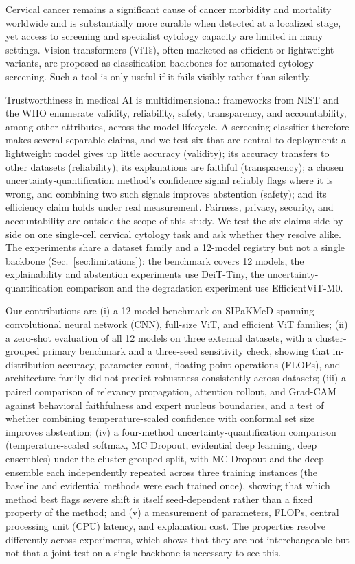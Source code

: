 \documentclass[12pt,letterpaper]{article}
\begin{document}
Cervical cancer remains a significant cause of cancer morbidity and mortality worldwide\cite{sung2021} and is substantially more curable when detected at a localized stage, yet access to screening\cite{dykens2020} and specialist cytology capacity\cite{walsh2024} are limited in many settings.
Vision transformers (ViTs), often marketed as efficient or lightweight variants, are proposed as classification backbones for automated cytology screening. Such a tool is only useful if it fails visibly rather than silently.

Trustworthiness in medical AI is multidimensional: frameworks from NIST and the WHO enumerate validity, reliability, safety, transparency, and accountability, among other attributes, across the model lifecycle.\cite{nist2023,who2021,lekadir2025} A screening classifier therefore makes several separable claims, and we test six that are central to deployment: a lightweight model gives up little accuracy (validity); its accuracy transfers to other datasets (reliability); its explanations are faithful (transparency); a chosen uncertainty-quantification method's confidence signal reliably flags where it is wrong, and combining two such signals improves abstention (safety); and its efficiency claim holds under real measurement. Fairness, privacy, security, and accountability are outside the scope of this study. We test the six claims side by side on one single-cell cervical cytology task and ask whether they resolve alike. The experiments share a dataset family and a 12-model registry but not a single backbone (Sec.~\ref{sec:limitations}): the benchmark covers 12 models, the explainability and abstention experiments use DeiT-Tiny, the uncertainty-quantification comparison and the degradation experiment use EfficientViT-M0.

Our contributions are (i) a 12-model benchmark on SIPaKMeD spanning convolutional neural network (CNN), full-size ViT, and efficient ViT families; (ii) a zero-shot evaluation of all 12 models on three external datasets, with a cluster-grouped primary benchmark and a three-seed sensitivity check, showing that in-distribution accuracy, parameter count, floating-point operations (FLOPs), and architecture family did not predict robustness consistently across datasets; (iii) a paired comparison of relevancy propagation, attention rollout, and Grad-CAM against behavioral faithfulness and expert nucleus boundaries, and a test of whether combining temperature-scaled confidence with conformal set size improves abstention; (iv) a four-method uncertainty-quantification comparison (temperature-scaled softmax, MC Dropout, evidential deep learning, deep ensembles) under the cluster-grouped split, with MC Dropout and the deep ensemble each independently repeated across three training instances (the baseline and evidential methods were each trained once), showing that which method best flags severe shift is itself seed-dependent rather than a fixed property of the method; and (v) a measurement of parameters, FLOPs, central processing unit (CPU) latency, and explanation cost. The properties resolve differently across experiments, which shows that they are not interchangeable but not that a joint test on a single backbone is necessary to see this.
\end{document}
